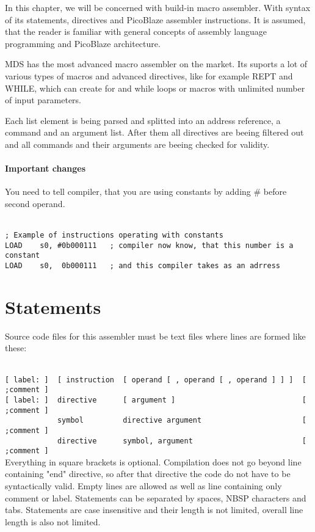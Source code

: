 In this chapter, we will be concerned with build-in macro assembler. With syntax of its statements, directives and PicoBlaze assembler instructions. It is assumed, that the reader is familiar with general concepts of assembly language programming and PicoBlaze architecture.

MDS has the most advanced macro assembler on the market. Its suports a lot of various types of macros and advanced directives, like for example REPT and WHILE, which can create for and while loops or  macros with unlimited number of input parameters.

Each list element is being parsed and splitted into an address reference, a command and an argument list. After them all directives are beeing filtered out and all commands and their arguments are beeing checked for validity.

\paragraph{Important changes}
    You need to tell compiler, that you are using constants by adding \# before second operand.

    {
        ~\\
        \usecodefont
        \verb'; Example of instructions operating with constants'\\
        \verb'LOAD    s0, #0b000111   ; compiler now know, that this number is a constant'\\
        \verb'LOAD    s0,  0b000111   ; and this compiler takes as an adrress'\\
    }

\section{Statements}
    Source code files for this assembler must be text files where lines are formed like these:

    {
        ~\\
        \usecodefont
        \verb'[ label: ]  [ instruction  [ operand [ , operand [ , operand ] ] ]  [ ;comment ]'\\
        \verb'[ label: ]  directive      [ argument ]                             [ ;comment ]'\\
        \verb'            symbol         directive argument                       [ ;comment ]'\\
        \verb'            directive      symbol, argument                         [ ;comment ]'\\
    }
    Everything in square brackets is optional. Compilation does not go beyond line containing "end" directive, so after that directive the code do not have to be syntactically valid. Empty lines are allowed as well as line containing only comment or label. Statements can be separated by spaces, NBSP characters and tabs. Statements are case insensitive and their length is not limited, overall line length is also not limited.

